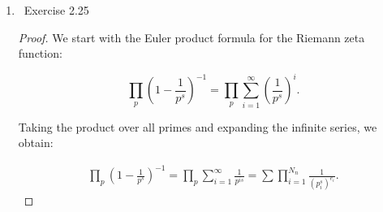 \documentclass[11pt]{article}
\newcommand\0{\mathbf{0}}
\newcommand\<{\langle}
\renewcommand\>{\rangle}
\renewcommand\iff{\Leftrightarrow}
\begin{document}
\begin{enumerate}
\begin{proof}
    \[
    \sum_{i=1}^{n} i = \sum_{d \mid n} \sum_{\substack{(t,n)=d}} t.
    \]  
    Using the substitution \( t = d t' \) where \( (t', n/d) = 1 \), we obtain:  
    \[
    \sum_{\substack{(t,n)=d}} t = d \sum_{\substack{(t',n/d)=1}} t' = d f(n/d).
    \]  
    Thus, we conclude:  
    \begin{align*}
        &\frac{(1+n)n}{2} = \sum_{d \mid n} d f(n/d),\\
        \iff\quad &\frac{(1+n)n}{2} = \sum_{d \mid n} (n/d) f(d),\\
        \iff\quad &(1+n) = \sum_{d \mid n} \frac{2 f(d)}{d}.
    \end{align*}
    
    Define \( g(n) = \frac{2 f(n)}{n} \). We want to show that $g(n) = \phi(n)$. 
    Writing \( n \) in its prime factorization as \( n = \prod_{i=1}^{k} p_i^{e_i} \), we obtain:  
    \begin{align*}
        &(1+n) = g \ast I(n),\\
        \iff\quad &g(n) = (\mu \ast I) \ast g(n) = \mu \ast (I \ast g)(n) = \sum_{d \mid n} \mu(d) \left( 1 + \frac{n}{d} \right),\\
        \iff\quad &g(n) = (1+n) - \sum_{i=1}^{k} \left( 1 + \frac{n}{p_i} \right) + \dots + (-1)^k \left( 1 + \frac{n}{\prod_{i=1}^{k} p_i} \right).
    \end{align*}
    
    Note that $1 + \frac{n}{p}$ is the number of elements in $\{0,1,2,\ldots,n\}$ divided by $p$ for $p\mid n$. By the principle of inclusion-exclusion, $g(n)$ equals to the number of elements in $\{0,1,2,\ldots,n\}$ that are coprime to $n$.
    We conclude that \( g(n) = \phi(n) \).
    
\end{proof}
\item\ Exercise  2.25
\begin{proof}
    We start with the Euler product formula for the Riemann zeta function:

    \[
        \prod_{p} \left( 1 - \frac{1}{p^s} \right)^{-1} = \prod_{p} \sum_{i=1}^{\infty} \left( \frac{1}{p^s} \right)^i.
    \]
    
    Taking the product over all primes and expanding the infinite series, we obtain:
    
    \begin{eqnarray}\label{zeta}
        \prod_{p} \left( 1 - \frac{1}{p^s} \right)^{-1} = \prod_{p} \sum_{i=1}^{\infty} \frac{1}{p^{is}} = \sum\prod_{i=1}^{N_n} \frac{1}{(p_i^s)^{e_i}}.
    \end{eqnarray}
    

\end{proof}
\end{enumerate}
\end{document}
